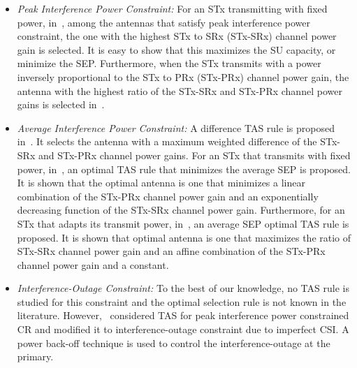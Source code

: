 \documentclass[12pt,draftcls,peerreview,onecolumn]{IEEEtran}
\begin{document}
\begin{itemize}
\item {\em Peak Interference Power Constraint:} For an STx transmitting with fixed power, in~\cite{Hanif_2015_globecom}, among the antennas that satisfy peak interference power constraint, the one with the highest STx to SRx (STx-SRx) channel power gain is selected. It is easy to show that this maximizes the SU capacity, or minimize the SEP. Furthermore, when the STx transmits with a power  inversely proportional to the STx to PRx (STx-PRx) channel power gain, the antenna with the highest ratio of the STx-SRx and STx-PRx channel power gains is selected in~\cite{Wang_2010_TWC}. 
%
\item {\em Average Interference Power Constraint:} A difference TAS rule is proposed in~\cite{Wang_2011_TCom}. It selects the antenna with a maximum weighted difference of the STx-SRx and STx-PRx channel power gains. For an STx that transmits with fixed power, in~\cite{Sarvendranath_2013_TCOM}, an optimal TAS rule that minimizes the average SEP is proposed. It is shown that the optimal antenna is one that minimizes a linear combination of the STx-PRx channel power gain and an exponentially decreasing function of the STx-SRx channel power gain. Furthermore, for an STx that adapts its transmit power, in~\cite{Sarvendranath_2014_TCOM}, an average SEP optimal TAS rule is proposed. It is shown that optimal antenna  is one that maximizes the ratio of STx-SRx channel power gain and an affine combination of the STx-PRx channel power gain and a constant. 

%

\item{\em Interference-Outage Constraint:} To the best of our knowledge, no TAS rule is studied for this constraint and the optimal selection rule is not known in the literature. However,~\cite{Peng_2016_eurasip} considered TAS for peak interference power constrained CR and modified it to interference-outage constraint due to imperfect CSI. A power back-off technique is used to control the interference-outage at the primary.

\end{itemize}
\end{document}
